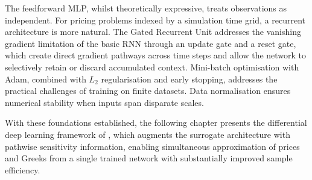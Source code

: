     The feedforward MLP, whilst theoretically expressive, treats observations as
    independent. For pricing problems indexed by a simulation time grid, a recurrent
    architecture is more natural. The Gated Recurrent Unit addresses the vanishing
    gradient limitation of the basic RNN through an update gate and a reset gate, which
    create direct gradient pathways across time steps and allow the network to
    selectively retain or discard accumulated context. Mini-batch optimisation with
    Adam, combined with $L_2$ regularisation and early stopping, addresses the
    practical challenges of training on finite datasets. Data normalisation ensures
    numerical stability when inputs span disparate scales.

    With these foundations established, the following chapter presents the differential
    deep learning framework of \citet{mrad2025differential}, which augments the
    surrogate architecture with pathwise sensitivity information, enabling simultaneous
    approximation of prices and Greeks from a single trained network with substantially
    improved sample efficiency.


